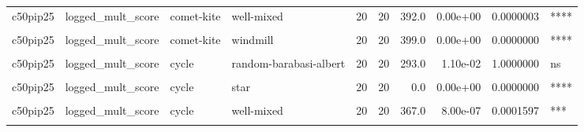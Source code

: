 \documentclass[
]{book}
\begin{document}
\begin{table}
\begin{tabular}{l|l|l|l|r|r|r|r|r|l}
\hline
\cellcolor{gray!6}{c50pip25} & \cellcolor{gray!6}{logged\_mult\_score} & \cellcolor{gray!6}{comet-kite} & \cellcolor{gray!6}{toroidal-lattice} & \cellcolor{gray!6}{20} & \cellcolor{gray!6}{20} & \cellcolor{gray!6}{399.0} & \cellcolor{gray!6}{0.00e+00} & \cellcolor{gray!6}{0.0000000} & \cellcolor{gray!6}{****}\\
\hline
c50pip25 & logged\_mult\_score & comet-kite & well-mixed & 20 & 20 & 392.0 & 0.00e+00 & 0.0000003 & ****\\
\hline
\cellcolor{gray!6}{c50pip25} & \cellcolor{gray!6}{logged\_mult\_score} & \cellcolor{gray!6}{comet-kite} & \cellcolor{gray!6}{wheel} & \cellcolor{gray!6}{20} & \cellcolor{gray!6}{20} & \cellcolor{gray!6}{281.0} & \cellcolor{gray!6}{2.80e-02} & \cellcolor{gray!6}{1.0000000} & \cellcolor{gray!6}{ns}\\
\hline
c50pip25 & logged\_mult\_score & comet-kite & windmill & 20 & 20 & 399.0 & 0.00e+00 & 0.0000000 & ****\\
\hline
\cellcolor{gray!6}{c50pip25} & \cellcolor{gray!6}{logged\_mult\_score} & \cellcolor{gray!6}{cycle} & \cellcolor{gray!6}{linear-chain} & \cellcolor{gray!6}{20} & \cellcolor{gray!6}{20} & \cellcolor{gray!6}{247.0} & \cellcolor{gray!6}{2.11e-01} & \cellcolor{gray!6}{1.0000000} & \cellcolor{gray!6}{ns}\\
\hline
c50pip25 & logged\_mult\_score & cycle & random-barabasi-albert & 20 & 20 & 293.0 & 1.10e-02 & 1.0000000 & ns\\
\hline
\cellcolor{gray!6}{c50pip25} & \cellcolor{gray!6}{logged\_mult\_score} & \cellcolor{gray!6}{cycle} & \cellcolor{gray!6}{random-waxman} & \cellcolor{gray!6}{20} & \cellcolor{gray!6}{20} & \cellcolor{gray!6}{311.0} & \cellcolor{gray!6}{2.00e-03} & \cellcolor{gray!6}{0.2760000} & \cellcolor{gray!6}{ns}\\
\hline
c50pip25 & logged\_mult\_score & cycle & star & 20 & 20 & 0.0 & 0.00e+00 & 0.0000000 & ****\\
\hline
\cellcolor{gray!6}{c50pip25} & \cellcolor{gray!6}{logged\_mult\_score} & \cellcolor{gray!6}{cycle} & \cellcolor{gray!6}{toroidal-lattice} & \cellcolor{gray!6}{20} & \cellcolor{gray!6}{20} & \cellcolor{gray!6}{341.0} & \cellcolor{gray!6}{6.00e-05} & \cellcolor{gray!6}{0.0096600} & \cellcolor{gray!6}{**}\\
\hline
c50pip25 & logged\_mult\_score & cycle & well-mixed & 20 & 20 & 367.0 & 8.00e-07 & 0.0001597 & ***\\
\hline
\cellcolor{gray!6}{c50pip25} & \cellcolor{gray!6}{logged\_mult\_score} & \cellcolor{gray!6}{cycle} & \cellcolor{gray!6}{wheel} & \cellcolor{gray!6}{20} & \cellcolor{gray!6}{20} & \cellcolor{gray!6}{170.0} & \cellcolor{gray!6}{4.29e-01} & \cellcolor{gray!6}{1.0000000} & \cellcolor{gray!6}{ns}\\

\end{tabular}
\end{table}
\end{document}
